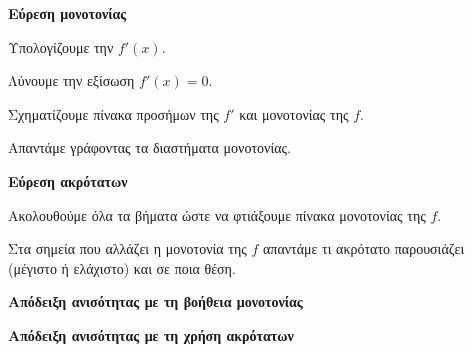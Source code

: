 \documentclass[twoside,nofonts,internet,math,spyros]{frontisthrio}
\begin{document}
\begin{arithmisi}
\item\textbf{Εύρεση μονοτονίας}
\begin{bhma}
\item Υπολογίζουμε την $ f'(x) $.
\item Λύνουμε την εξίσωση $ f'(x)=0 $.
\item Σχηματίζουμε πίνακα προσήμων της $ f' $ και μονοτονίας της $ f $.
\item Απαντάμε γράφοντας τα διαστήματα μονοτονίας.
\end{bhma}
\item\textbf{Εύρεση ακρότατων}
\begin{bhma}
\item Ακολουθούμε όλα τα βήματα ώστε να φτιάξουμε πίνακα μονοτονίας της $ f $.
\item Στα σημεία που αλλάζει η μονοτονία της $ f $ απαντάμε τι ακρότατο παρουσιάζει (μέγιστο ή ελάχιστο) και σε ποια θέση.
\end{bhma}
\item\textbf{Απόδειξη ανισότητας με τη βοήθεια μονοτονίας}
\item\textbf{Απόδειξη ανισότητας με τη χρήση ακρότατων}
\end{arithmisi}
\newpage
\end{document}
